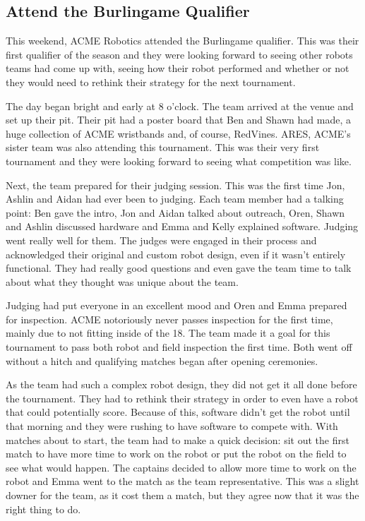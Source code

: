 \documentclass{article}
\begin{document}
\subsection{Attend the Burlingame Qualifier}
This weekend, ACME Robotics attended the Burlingame qualifier. This was their first qualifier of the season and they were looking forward to seeing other robots teams had come up with, seeing how their robot performed and whether or not they would need to rethink their strategy for the next tournament.

The day began bright and early at 8 o'clock. The team arrived at the venue and set up their pit. Their pit had a poster board that Ben and Shawn had made, a huge collection of ACME wristbands and, of course, RedVines. ARES, ACME's sister team was also attending this tournament. This was their very first tournament and they were looking forward to seeing what competition was like. 

Next, the team prepared for their judging session. This was the first time Jon, Ashlin and Aidan had ever been to judging. Each team member had a talking point: Ben gave the intro, Jon and Aidan talked about outreach, Oren, Shawn and Ashlin discussed hardware and Emma and Kelly explained software. Judging went really well for them. The judges were engaged in their process and acknowledged their original and custom robot design, even if it wasn't entirely functional. They had really good questions and even gave the team time to talk about what they thought was unique about the team. 

Judging had put everyone in an excellent mood and Oren and Emma prepared for inspection. ACME notoriously never passes inspection for the first time, mainly due to not fitting inside of the 18. The team made it a goal for this tournament to pass both robot and field inspection the first time. Both went off without a hitch and qualifying matches began after opening ceremonies. 

As the team had such a complex robot design, they did not get it all done before the tournament. They had to rethink their strategy in order to even have a robot that could potentially score. Because of this, software didn't get the robot until that morning and they were rushing to have software to compete with. With matches about to start, the team had to make a quick decision: sit out the first match to have more time to work on the robot or put the robot on the field to see what would happen. The captains decided to allow more time to work on the robot and Emma went to the match as the team representative. This was a slight downer for the team, as it cost them a match, but they agree now that it was the right thing to do. 
\end{document}
